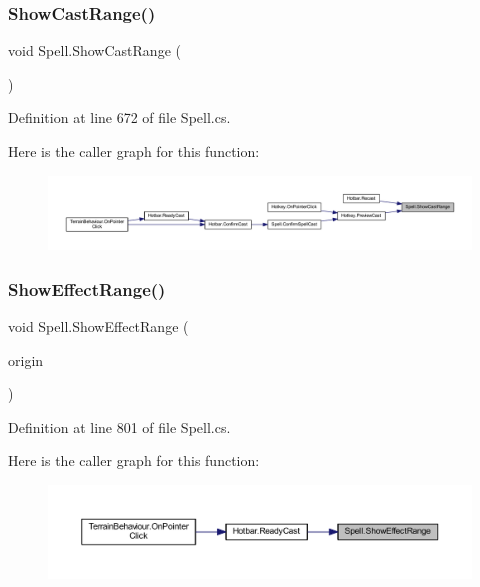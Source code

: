 \subsubsection{\texorpdfstring{ShowCastRange()}{ShowCastRange()}}
{\footnotesize\ttfamily void Spell.\+Show\+Cast\+Range (\begin{DoxyParamCaption}{ }\end{DoxyParamCaption})}



Definition at line 672 of file Spell.\+cs.

Here is the caller graph for this function\+:
\nopagebreak
\begin{figure}[H]
\begin{center}
\leavevmode
\includegraphics[width=350pt]{class_spell_ad49f8d3af9c5a885120ca85b510eae75_icgraph}
\end{center}
\end{figure}
\mbox{\label{class_spell_af7f2944573b064a7f561227d6f6fc601}} 
\subsubsection{\texorpdfstring{ShowEffectRange()}{ShowEffectRange()}}
{\footnotesize\ttfamily void Spell.\+Show\+Effect\+Range (\begin{DoxyParamCaption}\item[{Vector2\+Int}]{origin }\end{DoxyParamCaption})}



Definition at line 801 of file Spell.\+cs.

Here is the caller graph for this function\+:
\nopagebreak
\begin{figure}[H]
\begin{center}
\leavevmode
\includegraphics[width=350pt]{class_spell_af7f2944573b064a7f561227d6f6fc601_icgraph}
\end{center}
\end{figure}
\mbox{\label{class_spell_ac96caa87a4e57a75bd70672a7cd9b83c}} 
